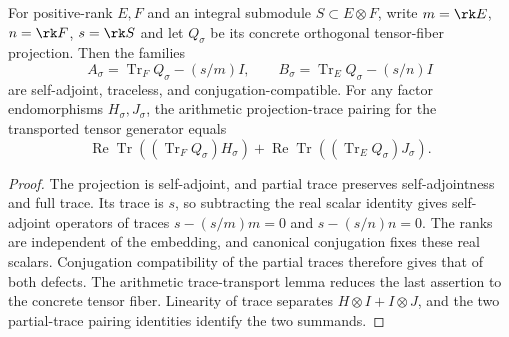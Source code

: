 \begin{lemma}
\label{lem:arithmetic-partial-trace-defects}
\leanok
For positive-rank $E,F$ and an integral submodule $S\subset E\otimes F$,
write $m=\rk E$, $n=\rk F$, $s=\rk S$ and let $Q_\sigma$ be its
concrete orthogonal tensor-fiber projection. Then the families
\[
 A_\sigma=\operatorname{Tr}_F Q_\sigma-(s/m)I,\qquad
 B_\sigma=\operatorname{Tr}_E Q_\sigma-(s/n)I
\]
are self-adjoint, traceless, and conjugation-compatible.
For any factor endomorphisms $H_\sigma,J_\sigma$, the arithmetic
projection-trace pairing for the transported tensor generator equals
\[
 \operatorname{Re}\operatorname{Tr}
   ((\operatorname{Tr}_F Q_\sigma)H_\sigma)
 +\operatorname{Re}\operatorname{Tr}
   ((\operatorname{Tr}_E Q_\sigma)J_\sigma).
\]
\end{lemma}
\begin{proof}
The projection is self-adjoint, and partial trace preserves
self-adjointness and full trace. Its trace is $s$, so subtracting the
real scalar identity gives self-adjoint operators of traces
$s-(s/m)m=0$ and $s-(s/n)n=0$. The ranks are independent of the
embedding, and canonical conjugation fixes these real scalars.
Conjugation compatibility of the partial traces therefore gives that
of both defects. The arithmetic trace-transport lemma reduces the last
assertion to the concrete tensor fiber. Linearity of trace separates
$H\otimes I+I\otimes J$, and the two partial-trace pairing identities
identify the two summands.
\end{proof}

